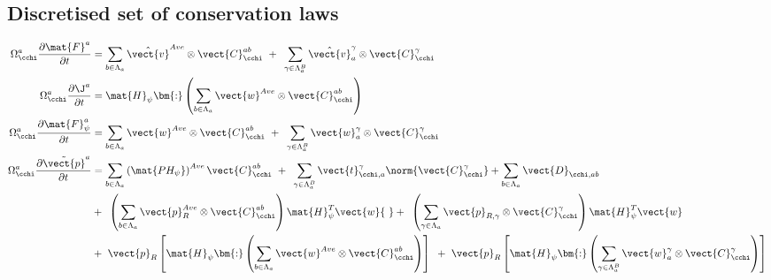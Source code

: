\subsection{Discretised set of conservation laws}
\begin{subequations}
\begin{align}
	\Omega_{\cchi}^a \frac{\partial \mat{F}^a}{\partial t} &= \sum\limits_{b\in\Lambda_a} \hat{\vect{v}}^{Ave} \otimes \vect{C}_{\cchi}^{ab} {~}+{~} \sum\limits_{\gamma\in\Lambda_a^B} \hat{\vect{v}}_{a}^\gamma \otimes \vect{C}_{\cchi}^{\gamma} \\
	\Omega_{\cchi}^a \frac{\partial \J^a}{\partial t} &= \mat{H}_{\psi} \bm{:} \left( \sum\limits_{b\in\Lambda_a} \vect{w}^{Ave} \otimes \vect{C}_{\cchi}^{ab} \right) \\
	\Omega_{\cchi}^a \frac{\partial \mat{F}_{\psi}^a}{\partial t} &= \sum\limits_{b\in\Lambda_a} \vect{w}^{Ave} \otimes \vect{C}_{\cchi}^{ab} {~}+{~} \sum\limits_{\gamma\in\Lambda_a^B} \vect{w}_{a}^{\gamma} \otimes \vect{C}_{\cchi}^{\gamma} \\
	\Omega_{\cchi}^a \frac{\partial \tilde{\vect{p}}^a}{\partial t} &= \sum\limits_{b\in\Lambda_a} \left( \mat{PH_{\psi}} \right)^{Ave} \vect{C}_{\cchi}^{ab} {~}+{~} \sum\limits_{\gamma\in\Lambda_a^B} \vect{t}_{\cchi,a}^\gamma  \norm{\vect{C}_{\cchi}^{\gamma}}    +\sum\limits_{b\in\Lambda_a} \vect{D}_{\cchi,ab} \nonumber\\
	&+{~} \left( \sum\limits_{b\in\Lambda_a} \vect{p}_R^{Ave} \otimes \vect{C}_{\cchi}^{ab} \right) \mat{H}_{\psi}^{T} \vect{w} {~}+{~} \left( \sum\limits_{\gamma\in\Lambda_a} \vect{p}_{R,\gamma} \otimes \vect{C}_{\cchi}^{\gamma} \right) \mat{H}_{\psi}^{T} \vect{w} \nonumber\\
	&+{~}  \vect{p}_R \left[ \mat{H}_{\psi} \bm{:} \left( \sum\limits_{b\in\Lambda_a} \vect{w}^{Ave} \otimes \vect{C}_{\cchi}^{ab} \right) \right] {~}+{~} \vect{p}_R \left[ \mat{H}_{\psi} \bm{:} \left( \sum\limits_{\gamma\in\Lambda_a^B} \vect{w}_a^{\gamma} \otimes \vect{C}_{\cchi}^{\gamma} \right) \right]
\end{align}
\end{subequations}

